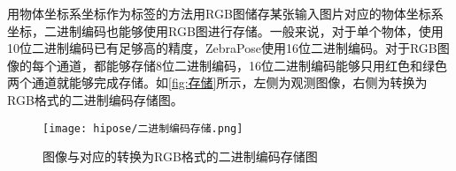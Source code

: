 用物体坐标系坐标作为标签的方法用RGB图储存某张输入图片对应的物体坐标系坐标，二进制编码也能够使用RGB图进行存储。一般来说，对于单个物体，使用10位二进制编码已有足够高的精度，ZebraPose使用16位二进制编码。对于RGB图像的每个通道，都能够存储8位二进制编码，16位二进制编码能够只用红色和绿色两个通道就能够完成存储。如\autoref{fig:存储}所示，左侧为观测图像，右侧为转换为RGB格式的二进制编码存储图。

\begin{figure}[ht]
    \centering
    \texttt{[image: hipose/二进制编码存储.png]}
    \caption{图像与对应的转换为RGB格式的二进制编码存储图}
    \label{fig:存储}
\end{figure}